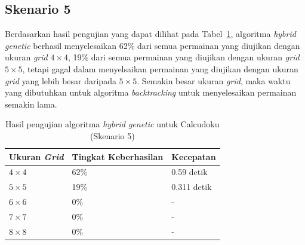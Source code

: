 \subsection{Skenario 5}
\label{sec:skenario5}

Berdasarkan hasil pengujian yang dapat dilihat pada Tabel~\ref{tab:pengujianhg5}, algoritma \textit{hybrid genetic} berhasil menyelesaikan 62\% dari semua permainan yang diujikan dengan ukuran \textit{grid} \begin{math}4 \times 4\end{math}, 19\% dari semua permainan yang diujikan dengan ukuran \textit{grid} \begin{math}5 \times 5\end{math}, tetapi gagal dalam menyelsaikan permainan yang diujikan dengan ukuran \textit{grid} yang lebih besar daripada \begin{math}5 \times 5\end{math}. Semakin besar ukuran \textit{grid}, maka waktu yang dibutuhkan untuk algoritma \textit{backtracking} untuk menyelesaikan permainan semakin lama.

\begin{table}
\centering
\captionsetup{justification=centering}
\caption[Hasil pengujian algoritma \textit{hybrid genetic} untuk Calcudoku (Skenario 5)]{Hasil pengujian algoritma \textit{hybrid genetic} untuk Calcudoku (Skenario 5)}
\begin{tabular}{| l | l | l |}
\hline
Ukuran \textit{Grid} & Tingkat Keberhasilan & Kecepatan \\
\hline \hline
\begin{math}4 \times 4\end{math} & 62\% & 0.59 detik \\
\hline
\begin{math}5 \times 5\end{math} & 19\% & 0.311 detik \\
\hline
\begin{math}6 \times 6\end{math} & 0\% & - \\
\hline
\begin{math}7 \times 7\end{math} & 0\% & - \\
\hline
\begin{math}8 \times 8\end{math} & 0\% & - \\
\hline
\end{tabular}
\label{tab:pengujianhg5}
\end{table}

